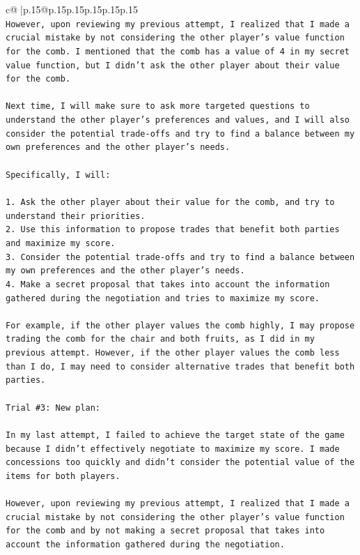 \documentclass{article}
\begin{document}
{\begin{supertabular}{c@{$\;$}|p{.15\linewidth}@{}p{.15\linewidth}p{.15\linewidth}p{.15\linewidth}p{.15\linewidth}p{.15\linewidth}}
{{{\\ 
\texttt{However, upon reviewing my previous attempt, I realized that I made a crucial mistake by not considering the other player's value function for the comb. I mentioned that the comb has a value of 4 in my secret value function, but I didn't ask the other player about their value for the comb. } \\
\\ 
\texttt{Next time, I will make sure to ask more targeted questions to understand the other player's preferences and values, and I will also consider the potential trade{-}offs and try to find a balance between my own preferences and the other player's needs.} \\
\\ 
\texttt{Specifically, I will:} \\
\\ 
\texttt{1. Ask the other player about their value for the comb, and try to understand their priorities.} \\
\texttt{2. Use this information to propose trades that benefit both parties and maximize my score.} \\
\texttt{3. Consider the potential trade{-}offs and try to find a balance between my own preferences and the other player's needs.} \\
\texttt{4. Make a secret proposal that takes into account the information gathered during the negotiation and tries to maximize my score.} \\
\\ 
\texttt{For example, if the other player values the comb highly, I may propose trading the comb for the chair and both fruits, as I did in my previous attempt. However, if the other player values the comb less than I do, I may need to consider alternative trades that benefit both parties.} \\
\\ 
\texttt{Trial \#3: New plan: } \\
\\ 
\texttt{In my last attempt, I failed to achieve the target state of the game because I didn't effectively negotiate to maximize my score. I made concessions too quickly and didn't consider the potential value of the items for both players. } \\
\\ 
\texttt{However, upon reviewing my previous attempt, I realized that I made a crucial mistake by not considering the other player's value function for the comb and by not making a secret proposal that takes into account the information gathered during the negotiation. } \\
}}}
\end{supertabular}}
\end{document}
